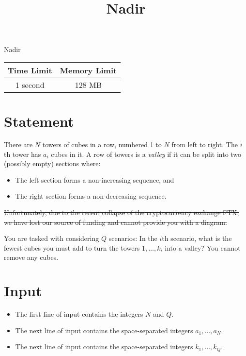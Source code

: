 \documentclass{article}
\begin{document}
\title{\vspace{-5ex}Nadir}
\author{\vspace{-5ex}}
\date{\vspace{-5ex}}
\pagestyle{fancy}
\fancyhf{}

\begin{center}
\huge{Nadir}\small\\
\vspace{5ex}
\begin{tabular}{|c|c|} 
\hline
Time Limit & Memory Limit \\
\hline
1 second & 128 MB \\

\hline
\end{tabular}
\end{center}
\section*{Statement}

There are $N$ towers of cubes in a row, numbered 1 to $N$ from left to right. The $i$th tower has $a_i$
cubes in it. A row of towers is a {\it valley} if it can be split into two (possibly empty) sections where:
\begin{itemize}
\item The left section forms a non-increasing sequence, and
\item The right section forms a non-decreasing sequence.
\end{itemize}

\sout{Unfortunately, due to the recent collapse of the cryptocurrency exchange FTX, we have lost our source of funding and cannot provide you with a diagram.}

You are tasked with considering $Q$ scenarios: In the $i$th scenario, what is the fewest cubes you must
add to turn the towers $1, \dots, k_i$ into a valley? You cannot remove any cubes.

\section*{Input}

\begin{itemize}
\item The first line of input contains the integers $N$ and $Q$.
\item The next line of input contains the space-separated integers $a_1, \dots, a_N$.
\item The next line of input contains the space-separated integers $k_1, \dots, k_Q$.
\end{itemize}
\end{document}
